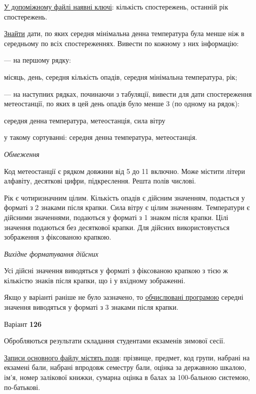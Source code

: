 \documentclass[11pt, ukrainian]{article}
\begin{document}
\underline{У допоміжному файлі наявні ключі}: кількість спостережень, останній рік спостережень.

\underline{Знайти} дати, по яких середня мінімальна денна температура була менше ніж в середньому по всіх спостереженнях. Вивести по кожному з них інформацію:\par
{\noindent}--- на першому рядку:\par
місяць, день, середня кількість опадів, середня мінімальна температура, рік;

{\noindent}--- на наступних рядках, починаючи з табуляції, вивести для дати спостереження метеостанції, по яких в цей день опадів було менше 3 (по одному на рядок):\par
середня денна температура, метеостанція, сила вітру

{\noindent}у такому сортуванні: середня денна температура, метеостанція.


\bigskip\textit{Обмеження}

Код метеостанції є рядком довжини від 5 до 11 включно.
Може містити літери алфавіту, десяткові цифри, підкреслення. Решта полів числові.

Рік є чотиризначним цілим.
Кількість опадів є дійсним значенням, подається у форматі з 2 знаками після крапки.
Сила вітру є цілим значенням.
Температури є дійсними значеннями, подаються у форматі з 1 знаком після крапки.
Цілі значення подаються без десяткової крапки.
Для дійсних використовується зображення з фіксованою крапкою.

\textit{Вихідне форматування дійсних}

Усі дійсні значення виводяться у форматі з фіксованою крапкою з тією ж кількістю знаків після крапки, що і у вхідному зображенні.

Якщо у варіанті раніше не було зазначено, то \underline{обчислювані програмою} середні значення виводяться у форматі з 3 знаками після крапки.




\par
\newpage
{\center Варіант  \No \textbf { 126 }\par}
\bigskip
Обробляються результати складання студентами екзаменів зимової сесії.

\underline{Записи основного файлу містять поля}: прізвище, предмет, код групи, набрані на екзамені бали, набрані впродовж семестру бали, оцінка за державною шкалою, ім’я, номер залікової книжки, сумарна оцінка в балах за 100-бальною системою, по-батькові.
\end{document}
